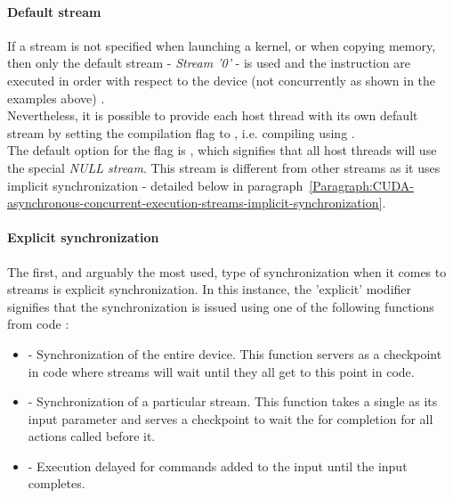 \paragraph{Default stream}\label{Paragraph:CUDA-asynchronous-concurrent-execution-streams-default-stream}
If a stream is not specified when launching a kernel, or when copying memory, then only the default stream - \textit{Stream '0'} - is used and the instruction are executed in order with respect to the device (not concurrently as shown in the examples above) \cite{NVIDIAMay2022}. \\
Nevertheless, it is possible to provide each host thread with its own default stream by setting the  compilation flag to , i.e. compiling using . \\
The default option for the flag is , which signifies that all host threads will use the special \textit{NULL stream}. This stream is different from other streams as it uses implicit synchronization - detailed below in paragraph~\ref{Paragraph:CUDA-asynchronous-concurrent-execution-streams-implicit-synchronization}.

\paragraph{Explicit synchronization}
The first, and arguably the most used, type of synchronization when it comes to streams is explicit synchronization. In this instance, the 'explicit' modifier signifies that the synchronization is issued using one of the following functions from code \cite{NVIDIAMay2022, NvidiaJanuary2022}:
\begin{itemize}
	\item {} - Synchronization of the entire device. This function servers as a checkpoint in code where streams will wait until they all get to this point in code.
	\item {} - Synchronization of a particular stream. This function takes a single  as its input parameter and serves a checkpoint to wait the for completion for all actions called before it.
	\item {} - Execution delayed for commands added to the input  until the input  completes.
\end{itemize}

